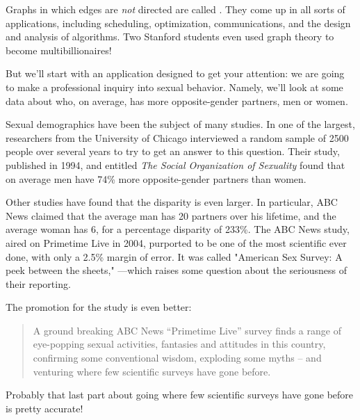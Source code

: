 %
%
%
%
%

\label{simple_graphs_chap}

Graphs in which edges are \emph{not} directed are called .  They come up in all sorts of applications, including
scheduling, optimization, communications, and the design and analysis
of algorithms.  Two Stanford students even used graph theory to become
multibillionaires!

But we'll start with an application designed to get your attention: we are
going to make a professional inquiry into sexual behavior.  Namely, we'll
look at some data about who, on average, has more opposite-gender
partners, men or women.

Sexual demographics have been the subject of many studies.  In one of the
largest, researchers from the University of Chicago interviewed a random
sample of 2500 people over several years to try to get an answer to this
question.  Their study, published in 1994, and entitled \emph{The Social
  Organization of Sexuality} found that on average men have 74\% more
opposite-gender partners than women.

Other studies have found that the disparity is even larger.  In
particular, ABC News claimed that the average man has 20 partners over his
lifetime, and the average woman has 6, for a percentage disparity of
233\%.  The ABC News study, aired on Primetime Live in 2004, purported to
be one of the most scientific ever done, with only a 2.5\% margin of
error.  It was called "American Sex Survey: A peek between the sheets,"
---which raises some question about the seriousness of their reporting.
\begin{staffnotes}
The promotion for the study is even better:
\begin{quote} 
A ground breaking ABC News ``Primetime Live'' survey finds a range of
eye-popping sexual activities, fantasies and attitudes in this country,
confirming some conventional wisdom, exploding some myths -- and venturing
where few scientific surveys have gone before.
\end{quote}
Probably that last part about going where few scientific surveys have gone
before is pretty accurate!
\end{staffnotes}

